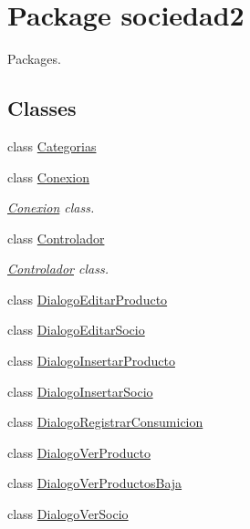 \hypertarget{namespacesociedad2}{}\section{Package sociedad2}
\label{namespacesociedad2}


Packages.  


\subsection*{Classes}
\begin{DoxyCompactItemize}
\item 
class \mbox{\hyperlink{classsociedad2_1_1_categorias}{Categorias}}
\item 
class \mbox{\hyperlink{classsociedad2_1_1_conexion}{Conexion}}
\begin{DoxyCompactList}\small\item\em \mbox{\hyperlink{classsociedad2_1_1_conexion}{Conexion}} class. \end{DoxyCompactList}\item 
class \mbox{\hyperlink{classsociedad2_1_1_controlador}{Controlador}}
\begin{DoxyCompactList}\small\item\em \mbox{\hyperlink{classsociedad2_1_1_controlador}{Controlador}} class. \end{DoxyCompactList}\item 
class \mbox{\hyperlink{classsociedad2_1_1_dialogo_editar_producto}{Dialogo\+Editar\+Producto}}
\item 
class \mbox{\hyperlink{classsociedad2_1_1_dialogo_editar_socio}{Dialogo\+Editar\+Socio}}
\item 
class \mbox{\hyperlink{classsociedad2_1_1_dialogo_insertar_producto}{Dialogo\+Insertar\+Producto}}
\item 
class \mbox{\hyperlink{classsociedad2_1_1_dialogo_insertar_socio}{Dialogo\+Insertar\+Socio}}
\item 
class \mbox{\hyperlink{classsociedad2_1_1_dialogo_registrar_consumicion}{Dialogo\+Registrar\+Consumicion}}
\item 
class \mbox{\hyperlink{classsociedad2_1_1_dialogo_ver_producto}{Dialogo\+Ver\+Producto}}
\item 
class \mbox{\hyperlink{classsociedad2_1_1_dialogo_ver_productos_baja}{Dialogo\+Ver\+Productos\+Baja}}
\item 
class \mbox{\hyperlink{classsociedad2_1_1_dialogo_ver_socio}{Dialogo\+Ver\+Socio}}
\item 

\end{DoxyCompactItemize}
